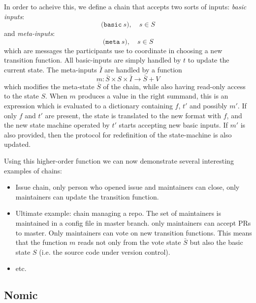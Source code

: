 In order to acheive this, we define a chain that accepts two sorts of inputs:
\emph{basic inputs}:
\[
\mathtt{(basic} \ s), \quad s \in S
\]
and \emph{meta-inputs}:
\[
\mathtt{(meta} \ s), \quad s \in S
\]
which are messages the participants use to coordinate in choosing a new
transition function. All basic-inputs are simply handled by $t$ to update the
current state. The meta-inputs $\bar I$ are handled by a function
\[
m \colon \bar S \times S \times \bar I \to \bar S + V
\]
which modifies the meta-state $\bar S$ of the chain, while also having read-only
access to the state $S$. When $m$ produces a value in the right summand, this is
an expression which is evaluated to a dictionary containing $f$, $t'$ and
possibly $m'$. If only $f$ and $t'$ are present, the state is translated to the
new format with $f$, and the new state machine operated by $t'$ starts accepting
new basic inputs. If $m'$ is also provided, then the protocol for redefinition
of the state-machine is also updated.

Using this higher-order function we can now demonstrate several interesting examples of chains:
\begin{itemize}
\item Issue chain, only person who opened issue and maintainers can close, only maintainers can update the transition function.
\item Ultimate example: chain managing a repo. The set of maintainers is maintained in a config file in master branch. only maintainers can accept PRs to master. Only maintainers can vote on new transition functions. This means that the function $m$ reads not only from the vote state $\bar S$ but also the basic state $S$ (i.e. the source code under version control).
\item etc.
\end{itemize}

\subsection{Nomic}
\label{s:examples}
